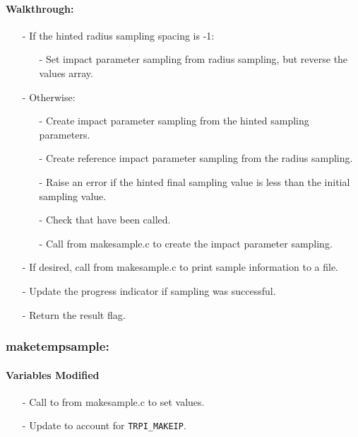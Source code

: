 \documentclass[letterpaper,12pt]{article}
\begin{document}
\paragraph{Walkthrough:}
\begin{itemize}[leftmargin=10pt, noitemsep, parsep=0pt, topsep=0ex]
\item[-] If the hinted radius sampling spacing is -1:
\begin{itemize}[leftmargin=10pt, noitemsep, parsep=0pt, topsep=0ex]
\item[-] Set impact parameter sampling from radius sampling, but reverse the values array.
\end{itemize}
\item[-] Otherwise:
\begin{itemize}[leftmargin=10pt, noitemsep, parsep=0pt, topsep=0ex]
\item[-] Create impact parameter sampling from the hinted sampling parameters.
\item[-] Create reference impact parameter sampling from the radius sampling.
\item[-] Raise an error if the hinted final sampling value is less than the initial sampling value.
\item[-] Check that  have been called.
\item[-] Call  from makesample.c to create the impact parameter sampling.
\end{itemize}
\item[-] If desired, call  from makesample.c to print sample information to a file.
\item[-] Update the progress indicator if sampling was successful.
\item[-] Return the result flag.
\end{itemize}


\subsubsection{maketempsample:}
\paragraph{Variables Modified}
\begin{itemize}[leftmargin=10pt, noitemsep, parsep=0pt, topsep=0ex]
\item[-] Call to  from makesample.c to set  values.
\item[-] Update  to account for {\tt TRPI\_MAKEIP}.
\end{itemize}
\end{document}
